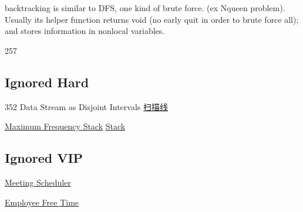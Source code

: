 \documentclass[
]{article}
\begin{document}
backtracking is similar to DFS, one kind of brute force. (ex Nqueen
problem). Usually its helper function returns void (no early quit in
order to brute force all); and stores information in nonlocal variables.

257

\hypertarget{ignored-hard}{%
\subsection{Ignored Hard}\label{ignored-hard}}

352 Data Stream as Disjoint Intervals
\href{https://www.youtube.com/watch?v=ihf8JjQdta0\&t=1221s}{扫描线}

\href{https://leetcode.com/problems/maximum-frequency-stack}{Maximum
Frequency Stack}
\href{https://www.youtube.com/watch?v=cV3SpacBh3M\&t=11s}{Stack}

\hypertarget{ignored-vip}{%
\subsection{Ignored VIP}\label{ignored-vip}}

\href{https://leetcode.com/problems/meeting-scheduler}{ Meeting
Scheduler}

\href{https://leetcode.com/problems/employee-free-time}{Employee Free
Time}
\end{document}
